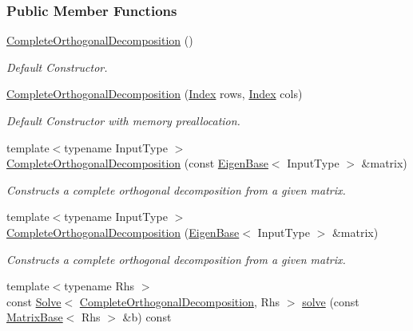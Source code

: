 \subsubsection*{Public Member Functions}
\begin{DoxyCompactItemize}
\item 
\hyperlink{group___q_r___module_a7ba33814fd3fdc62f6179cdcd655c679}{Complete\+Orthogonal\+Decomposition} ()
\begin{DoxyCompactList}\small\item\em Default Constructor. \end{DoxyCompactList}\item 
\hyperlink{group___q_r___module_aa6c282dd7452ebe754024edb71bebd09}{Complete\+Orthogonal\+Decomposition} (\hyperlink{namespace_eigen_a62e77e0933482dafde8fe197d9a2cfde}{Index} rows, \hyperlink{namespace_eigen_a62e77e0933482dafde8fe197d9a2cfde}{Index} cols)
\begin{DoxyCompactList}\small\item\em Default Constructor with memory preallocation. \end{DoxyCompactList}\item 
{\footnotesize template$<$typename Input\+Type $>$ }\\\hyperlink{group___q_r___module_afcfaf7a395f853247c23bb52b1ffb1cc}{Complete\+Orthogonal\+Decomposition} (const \hyperlink{group___core___module_struct_eigen_1_1_eigen_base}{Eigen\+Base}$<$ Input\+Type $>$ \&matrix)
\begin{DoxyCompactList}\small\item\em Constructs a complete orthogonal decomposition from a given matrix. \end{DoxyCompactList}\item 
{\footnotesize template$<$typename Input\+Type $>$ }\\\hyperlink{group___q_r___module_a082295ba2aac35a8b8b9e2d46e1d7ce4}{Complete\+Orthogonal\+Decomposition} (\hyperlink{group___core___module_struct_eigen_1_1_eigen_base}{Eigen\+Base}$<$ Input\+Type $>$ \&matrix)
\begin{DoxyCompactList}\small\item\em Constructs a complete orthogonal decomposition from a given matrix. \end{DoxyCompactList}\item 
{\footnotesize template$<$typename Rhs $>$ }\\const \hyperlink{group___core___module_class_eigen_1_1_solve}{Solve}$<$ \hyperlink{group___q_r___module_class_eigen_1_1_complete_orthogonal_decomposition}{Complete\+Orthogonal\+Decomposition}, Rhs $>$ \hyperlink{group___q_r___module_ab303e177cc7df17e435c79dca9ef5654}{solve} (const \hyperlink{group___core___module_class_eigen_1_1_matrix_base}{Matrix\+Base}$<$ Rhs $>$ \&b) const

\end{DoxyCompactItemize}
